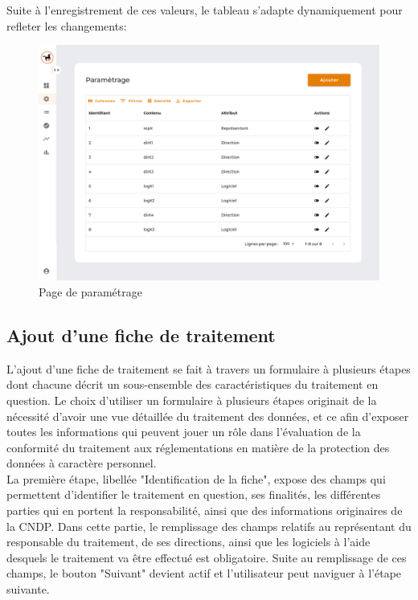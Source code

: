 \noindent Suite à l'enregistrement de ces valeurs, le tableau s'adapte dynamiquement pour refleter les changements: \\

\begin{figure}[H]
    \centering
    \includegraphics[width=\textwidth]{images/guis/parametrage/post-children-save-table.png}
    \caption{Page de paramétrage}
\end{figure}


\clearpage
\subsection{Ajout d'une fiche de traitement}

L'ajout d'une fiche de traitement se fait à travers un formulaire à plusieurs étapes dont chacune décrit un sous-ensemble des caractéristiques du traitement en question. Le choix d'utiliser un formulaire à plusieurs étapes originait de la nécessité d'avoir une vue détaillée du traitement des données, et ce afin d'exposer toutes les informations qui peuvent jouer un rôle dans l'évaluation de la conformité du traitement aux réglementations en matière de la protection des données à caractère personnel. \\

\noindent La première étape, libellée "Identification de la fiche", expose des champs qui permettent d'identifier le traitement en question, ses finalités, les différentes parties qui en portent la responsabilité, ainsi que des informations originaires de la CNDP. Dans cette partie, le remplissage des champs relatifs au représentant du responsable du traitement, de ses directions, ainsi que les logiciels à l'aide desquels le traitement va être effectué est obligatoire. Suite au remplissage de ces champs, le bouton "Suivant" devient actif et l'utilisateur peut naviguer à l'étape suivante. \\

